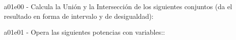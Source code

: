 \documentclass[spanish, 11pt]{exam}
\begin{document}
        \begin{questions}
        
        \question a01e00 - Calcula la Unión y la Intersección de los siguientes conjuntos (da el resultado en forma de intervalo y de desigualdad):
        \begin{multicols}{1} 
        \begin{parts} \part[1] $A=\left[2, 10\right)$ y $B=\left(7, 12\right)$  \begin{solution}   Unión: \\ $A\cup B=\left[2, 12\right)$ ó $A\cup B= \{x|2 \leq x  < 12\}$ \\Intersección: \\ $A\cap B =\left(7, 10\right)$ ó $A\cap B=\{x|7 < x < 10\}$ \end{solution} 
        \end{parts}
        \end{multicols}
        \question a01e01 - Opera las siguientes potencias con variables::
        \begin{multicols}{2} 
\end{multicols}
\end{questions}
\end{document}
